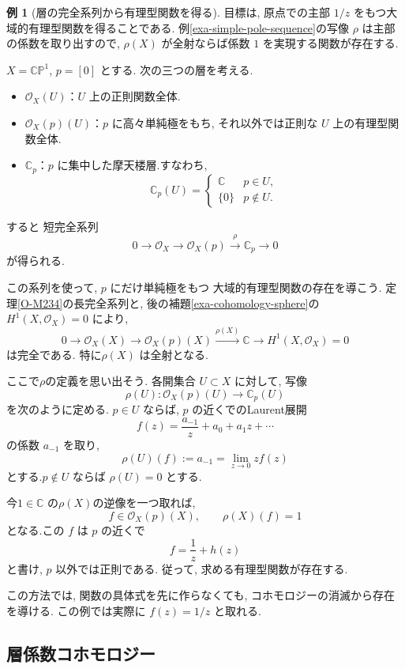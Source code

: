 \documentclass[dvipdfmx,a4paper,11pt]{article} %
\newcommand{\C}{\mathbb{C}}
\theoremstyle{definition}
\numberwithin{equation}{section}
\newtheorem{exa}[thm]{例}
\begin{document}
\begin{exa}[層の完全系列から有理型関数を得る]
目標は, 原点での主部 $1/z$ をもつ大域的有理型関数を得ることである. 例\ref{exa-simple-pole-sequence}の写像 $\rho$ は主部の係数を取り出すので, $\rho(X)$ が全射ならば係数 $1$ を実現する関数が存在する.


$X=\C\mathbb P^1$, $p=[0]$ とする.
次の三つの層を考える.
\begin{itemize}
\item $\mathcal O_X(U)$：$U$ 上の正則関数全体.
\item $\mathcal O_X(p)(U)$：$p$ に高々単純極をもち, 
それ以外では正則な $U$ 上の有理型関数全体.
\item $\C_p$：$p$ に集中した摩天楼層.すなわち, 
\[
\C_p(U)=
\begin{cases}
\C & p\in U,\\
\{0\} & p\notin U.
\end{cases}
\]
\end{itemize}
すると
短完全系列
\[
0\longrightarrow\mathcal O_X
\longrightarrow\mathcal O_X(p)
\xrightarrow{\rho}\C_p
\longrightarrow0
\]
が得られる.

この系列を使って, $p$ にだけ単純極をもつ
大域的有理型関数の存在を導こう.
定理\ref{O-M234}の長完全系列と, 後の補題\ref{exa-cohomology-sphere}の $H^1(X,\mathcal O_X)=0$ により, 
\[
0\longrightarrow
\mathcal O_X(X)
\longrightarrow
\mathcal O_X(p)(X)
\xrightarrow{\rho(X)}\C
\longrightarrow H^1(X,\mathcal O_X)=0
\]
は完全である.
特に$\rho(X)$ は全射となる.

ここで$\rho$の定義を思い出そう. 各開集合 $U\subset X$ に対して, 写像
\[
\rho(U):\mathcal O_X(p)(U)\longrightarrow\C_p(U)
\]
を次のように定める.
$p\in U$ ならば, $p$ の近くでのLaurent展開
\[
f(z)=\frac{a_{-1}}z+a_0+a_1z+\cdots
\]
の係数 $a_{-1}$ を取り, 
\[
\rho(U)(f):=a_{-1}=\lim_{z\to0}zf(z)
\]
とする.$p\notin U$ ならば $\rho(U)=0$ とする.


今$1\in\C$ の$\rho(X)$の逆像を一つ取れば, 
\[
f\in\mathcal O_X(p)(X),\qquad \rho(X)(f)=1
\]
となる.この $f$ は $p$ の近くで
\[
f=\frac1z+h(z)
\]
と書け, $p$ 以外では正則である.
従って, 求める有理型関数が存在する.

この方法では, 関数の具体式を先に作らなくても, コホモロジーの消滅から存在を導ける. この例では実際に $f(z)=1/z$ と取れる. 
\end{exa}

\subsection{層係数コホモロジー}
\end{document}
